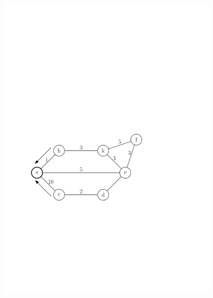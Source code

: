 \documentclass[10pt,xcolor=dvipsnames]{beamer}
\begin{document}
\begin{frame}
	\frametitle{}
	
	\begin{figure}[h]
		\hspace*{22pt}\includegraphics[scale=0.5]{routing_table_graph_send.pdf}
	\end{figure}
	\begin{figure}[h]
	\centering

\end{figure}
\end{frame}
\end{document}
